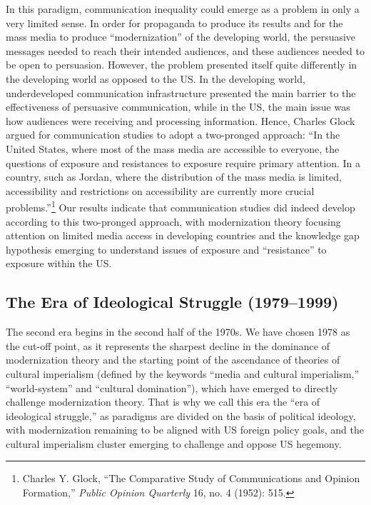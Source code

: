 \documentclass{tufte-handout}
\begin{document}
In this paradigm, communication inequality could emerge as a problem in
only a very limited sense. In order for propaganda to produce its
results and for the mass media to produce ``modernization'' of the
developing world, the persuasive messages needed to reach their intended
audiences, and these audiences needed to be open to persuasion. However,
the problem presented itself quite differently in the developing world
as opposed to the US. In the developing world, underdeveloped
communication infrastructure presented the main barrier to the
effectiveness of persuasive communication, while in the US, the main
issue was how audiences were receiving and processing information.
Hence, Charles Glock argued for communication studies to adopt a
two-pronged approach: ``In the United States, where most of the mass
media are accessible to everyone, the questions of exposure and
resistances to exposure require primary attention. In a country, such as
Jordan, where the distribution of the mass media is limited,
accessibility and restrictions on accessibility are currently more
crucial problems.''\footnote{Charles Y. Glock, ``The Comparative Study
  of Communications and Opinion Formation,'' \emph{Public Opinion
  Quarterly} 16, no. 4 (1952): 515.} Our results indicate that
communication studies did indeed develop according to this two-pronged
approach, with modernization theory focusing attention on limited media
access in developing countries and the knowledge gap hypothesis emerging
to understand issues of exposure and ``resistance'' to exposure within
the US.

\hypertarget{the-era-of-ideological-struggle-19791999}{%
\subsection{The Era of Ideological Struggle
(1979--1999)}\label{the-era-of-ideological-struggle-19791999}}

The second era begins in the second half of the 1970s. We have chosen
1978 as the cut-off point, as it represents the sharpest decline in the
dominance of modernization theory and the starting point of the
ascendance of theories of cultural imperialism (defined by the keywords
``media and cultural imperialism,'' ``world-system'' and ``cultural
domination''), which have emerged to directly challenge modernization
theory. That is why we call this era the ``era of ideological
struggle,'' as paradigms are divided on the basis of political ideology,
with modernization remaining to be aligned with US foreign policy goals,
and the cultural imperialism cluster emerging to challenge and oppose US
hegemony.
\end{document}
